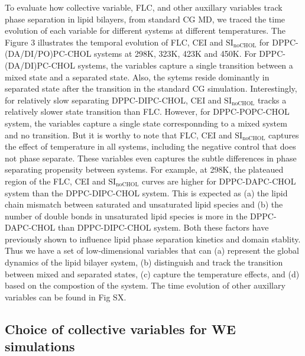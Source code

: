 \documentclass{biophys-new}
\begin{document}
To evaluate how collective variable, FLC, and other auxillary variables track phase separation in lipid bilayers,
from standard CG MD, we traced the time evolution of each variable for different systems at different temperatures.
The Figure 3 illustrates the temporal evolution of FLC, CEI and $\text{SI}_{\text{noCHOL}}$ for DPPC-(DA/DI/PO)PC-CHOL systems at 298K, 323K, 423K and 450K.
For DPPC-(DA/DI)PC-CHOL systems, the variables capture a single transition between a mixed state and a separated state.
Also, the sytems reside dominantly in separated state after the transition in the standard CG simulation.
Interestingly, for relatively slow separating DPPC-DIPC-CHOL, CEI and $\text{SI}_{\text{noCHOL}}$ tracks a relatively slower state transition than FLC.
However, for DPPC-POPC-CHOL system, the variables capture a single state corresponnding to a mixed system and no transition.
But it is worthy to note that FLC, CEI and $\text{SI}_{\text{noCHOL}}$ captures the effect of temperature in all systems, including the negative control that does not phase separate.
These variables even captures the subtle differences in phase separating propensity between systems.
For example, at 298K, the plateaued region of the FLC, CEI and $\text{SI}_{\text{noCHOL}}$ curves are higher for DPPC-DAPC-CHOL system than the DPPC-DIPC-CHOL system.
This is expected as (a) the lipid chain mismatch between saturated and unsaturated lipid species and (b) the number of double bonds in unsaturated lipid species is more in the DPPC-DAPC-CHOL than DPPC-DIPC-CHOL system.
Both these factors have previously shown to influence lipid phase separation kinetics and domain stablity\cite{Fowler2016,Lin2016}.
Thus we have a set of low-dimensional variables that can (a) represent the global dynamics of the lipid bilayer system,
(b) distinguish and track the transition between mixed and separated states, (c) capture the temperature effects,
and (d) based on the compostion of the system.
The time evolution of other auxillary variables can be found in Fig SX.
\\

\subsection*{Choice of collective variables for WE simulations}
\end{document}
